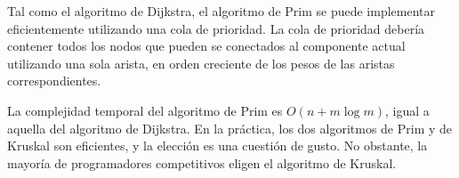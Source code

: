 Tal como el algoritmo de Dijkstra, el algoritmo de Prim se puede
implementar eficientemente utilizando una cola de prioridad. La
cola de prioridad debería contener todos los nodos que pueden
se conectados al componente actual utilizando una sola arista,
en orden creciente de los pesos de las aristas correspondientes.

La complejidad temporal del algoritmo de Prim es
$O(n + m \log m)$, igual a aquella del algoritmo de Dijkstra.
En la práctica, los dos algoritmos de Prim y de Kruskal son eficientes,
y la elección es una cuestión de gusto. No obstante, la mayoría de
programadores competitivos eligen el algoritmo de Kruskal.